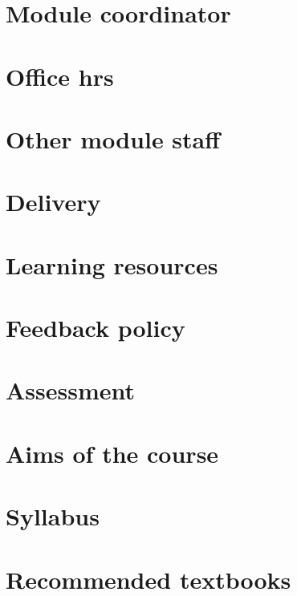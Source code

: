 \renewcommand{\thispart}{0 }
\renewcommand{\thispartname}{Information on \modulename}

\section{Module coordinator}


\section{Office hrs}


\section{Other module staff}


\section{Delivery}


\section{Learning resources}

\section{Feedback policy}


\section{Assessment}


\section{Aims of the course}


\section{Syllabus}


\section{Recommended textbooks}


